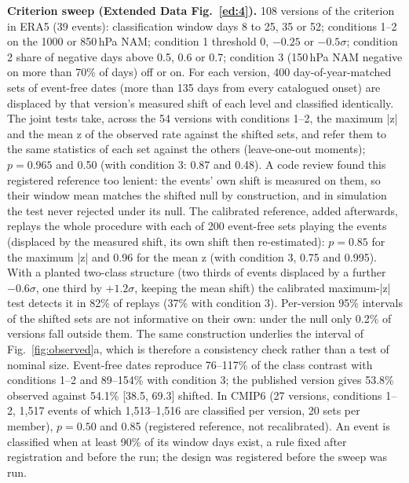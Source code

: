 \documentclass[11pt]{article}
\begin{document}
\textbf{Criterion sweep (Extended Data Fig.~\ref{ed:4}).} 108 versions of the criterion in ERA5 (39 events): classification window days 8 to 25, 35 or 52; conditions 1–2 on the 1000 or 850\,hPa NAM; condition 1 threshold 0, $-0.25$ or $-0.5\sigma$; condition 2 share of negative days above 0.5, 0.6 or 0.7; condition 3 (150\,hPa NAM negative on more than 70\% of days) off or on. For each version, 400 day-of-year-matched sets of event-free dates (more than 135 days from every catalogued onset) are displaced by that version's measured shift of each level and classified identically. The joint tests take, across the 54 versions with conditions 1–2, the maximum |z| and the mean z of the observed rate against the shifted sets, and refer them to the same statistics of each set against the others (leave-one-out moments); $p = 0.965$ and 0.50 (with condition 3: 0.87 and 0.48). A code review found this registered reference too lenient: the events' own shift is measured on them, so their window mean matches the shifted null by construction, and in simulation the test never rejected under its null. The calibrated reference, added afterwards, replays the whole procedure with each of 200 event-free sets playing the events (displaced by the measured shift, its own shift then re-estimated): $p = 0.85$ for the maximum |z| and 0.96 for the mean z (with condition 3, 0.75 and 0.995). With a planted two-class structure (two thirds of events displaced by a further $-0.6\sigma$, one third by $+1.2\sigma$, keeping the mean shift) the calibrated maximum-|z| test detects it in 82\% of replays (37\% with condition 3). Per-version 95\% intervals of the shifted sets are not informative on their own: under the null only 0.2\% of versions fall outside them. The same construction underlies the interval of Fig.~\ref{fig:observed}a, which is therefore a consistency check rather than a test of nominal size. Event-free dates reproduce 76–117\% of the class contrast with conditions 1–2 and 89–154\% with condition 3; the published version gives 53.8\% observed against 54.1\% [38.5, 69.3] shifted. In CMIP6 (27 versions, conditions 1–2, 1,517 events of which 1,513–1,516 are classified per version, 20 sets per member), $p = 0.50$ and 0.85 (registered reference, not recalibrated). An event is classified when at least 90\% of its window days exist, a rule fixed after registration and before the run; the design was registered before the sweep was run.
\end{document}
